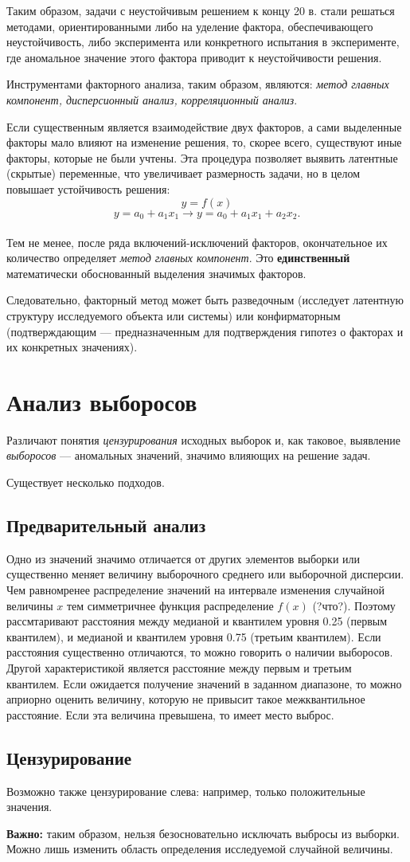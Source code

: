 \documentclass[12pt]{article}
\begin{document}
Таким образом, задачи с неустойчивым решением к концу 20 в. стали решаться методами, ориентированными либо на уделение фактора, обеспечивающего неустойчивость, либо эксперимента или конкретного испытания в эксперименте, где аномальное значение этого фактора приводит к неустойчивости решения.

Инструментами факторного анализа, таким образом, являются: \emph{метод главных компонент, дисперсионный анализ, корреляционный анализ}.

Если существенным является взаимодействие двух факторов, а сами выделенные факторы мало влияют на изменение решения, то, скорее всего, существуют иные факторы, которые не были учтены. Эта процедура позволяет выявить латентные (скрытые) переменные, что увеличивает размерность задачи, но в целом повышает устойчивость решения:
\[ y = f(x)\]
\[ y = a_0 + a_1 x_1 \longrightarrow y = a_0 + a_1 x_1 + a_2 x_2. \]\\ 

Тем не менее, после ряда включений-исключений факторов, окончательное их количество определяет \emph{метод главных компонент}. Это \textbf{единственный} математически обоснованный выделения значимых факторов.

Следовательно, факторный метод может быть разведочным (исследует латентную структуру исследуемого объекта или системы) или конфирматорным (подтверждающим --- предназначенным для подтверждения гипотез о факторах и их конкретных значениях).

\newpage
\section{Анализ выборосов}
Различают понятия \emph{цензурирования} исходных выборок и, как таковое, выявление \emph{выборосов} --- аномальных значений, значимо влияющих на решение задач.

Существует несколько подходов.

\subsection{Предварительный анализ}
Одно из значений значимо отличается от других элементов выборки или существенно меняет величину выборочного среднего или выборочной дисперсии. Чем равномренее распределение значений на интервале изменения случайной величины $x$ тем симметричнее функция распределение $f(x)$ (?что?). Поэтому рассмтаривают расстояния между медианой и квантилем уровня 0.25 (первым квантилем), и медианой и квантилем уровня 0.75 (третьим квантилем). Если расстояния существенно отличаются, то можно говорить о наличии выборосов. Другой характеристикой является расстояние между первым и третьим квантилем. Если ожидается получение значений в заданном диапазоне, то можно априорно оценить величину, которую не привысит такое межквантильное расстояние. Если эта величина превышена, то имеет место выброс.

\subsection{Цензурирование}
Возможно также цензурирование слева: например, только положительные значения.

\begin{framed}
\textbf{Важно:} таким образом, нельзя безосновательно исключать выбросы из выборки. Можно лишь изменить область определения исследуемой случайной величины.  
\end{framed}
\end{document}
